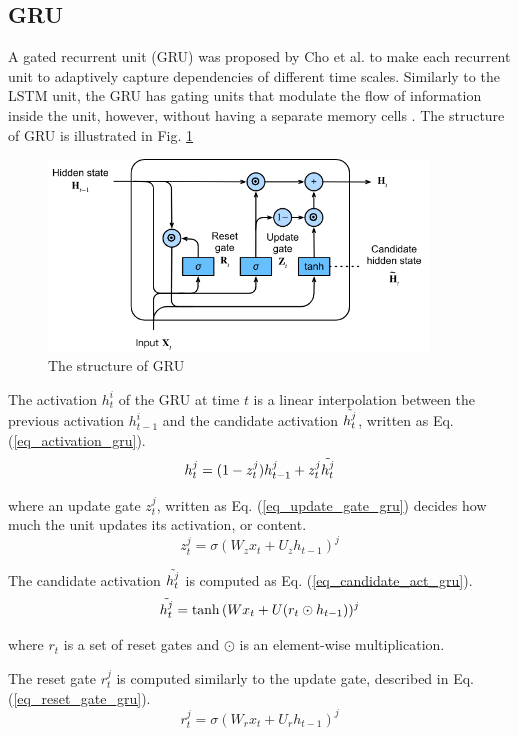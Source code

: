 \documentclass[conference]{IEEEtran}
\begin{document}
\subsection{GRU}
A gated recurrent unit (GRU) was proposed by Cho et al. \cite{b9} to make each recurrent unit to adaptively capture dependencies of different time scales. Similarly to the LSTM unit, the GRU has gating units that modulate the flow of information inside the unit, however, without having a separate memory cells \cite{b10}. The structure of GRU is illustrated in Fig. \ref{fig_gru_structure}
\begin{figure}[H]
    \centering
    \begin{minipage}{0.45\textwidth}
    \centering
    \includegraphics[width=0.9\textwidth]{figures/method/GRU_structure.png}
    \caption{The structure of GRU}
    \label{fig_gru_structure}
    \end{minipage}
\end{figure}\par
The activation \(h_t^i\) of the GRU at time \(t\) is a linear interpolation between the previous activation \(h_{t-1}^i\) and the candidate activation \(\Tilde{h_t^j}\), written as Eq. (\ref{eq_activation_gru}).
\begin{equation}\label{eq_activation_gru}
    h_t^j = (1-z_t^j)h_{t-1}^j + z_t^j\Tilde{h_t^j}
\end{equation}\par
where an update gate \(z_t^j\), written as Eq. (\ref{eq_update_gate_gru}) decides how much the unit updates its activation, or content.
\begin{equation}\label{eq_update_gate_gru}
    z_t^j = \sigma(W_zx_t + U_zh_{t-1})^j
\end{equation}\par
The candidate activation \(\Tilde{h_t^j}\) is computed as Eq. (\ref{eq_candidate_act_gru}).
\begin{equation}\label{eq_candidate_act_gru}
    \Tilde{h_t^j} = \tanh{(Wx_t + U(r_t \odot h_{t-1}}))^j
\end{equation}\par
where \(r_t\) is a set of reset gates and \(\odot\) is an element-wise multiplication.\par
The reset gate \(r_t^j\) is computed similarly to the update gate, described in Eq. (\ref{eq_reset_gate_gru}).
\begin{equation}\label{eq_reset_gate_gru}
    r_t^j = \sigma(W_rx_t + U_rh_{t-1})^j
\end{equation}
\end{document}
